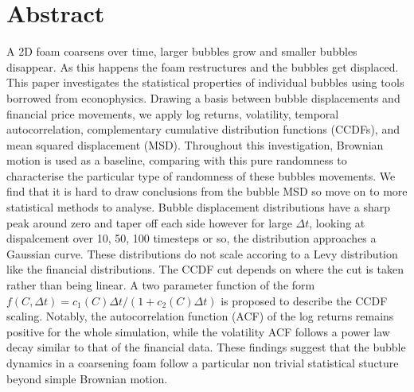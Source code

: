 \section*{Abstract}
A 2D foam coarsens over time, larger bubbles grow and smaller bubbles disappear. As this happens the foam restructures and the bubbles get displaced. This paper investigates the statistical properties of individual bubbles using tools borrowed from econophysics.  Drawing a basis between bubble displacements and financial price movements, we apply log returns, volatility, temporal autocorrelation, complementary cumulative distribution functions (CCDFs), and mean squared displacement (MSD). Throughout this investigation, Brownian motion is used as a baseline, comparing with this pure randomness to characterise the particular type of randomness of these bubbles movements. We find that it is hard to draw conclusions from the bubble MSD so move on to more statistical methods to analyse. Bubble displacement distributions have a sharp peak around zero and taper off each side however for large $\Delta t$, looking at dispalcement over 10, 50, 100 timesteps or so, the distribution approaches a Gaussian curve. These distributions do not scale accoring to a Levy distribution like the financial distributions. The CCDF cut depends on where the cut is taken rather than being linear. A two parameter function of the form $f(C, \Delta t) = c_1(C) \Delta t/ (1 + c_2(C)\Delta t)$ is proposed to describe the CCDF scaling. Notably, the autocorrelation function (ACF) of the log returns remains positive for the whole simulation, while the volatility ACF follows a power law decay similar to that of the financial data. These findings suggest that the bubble dynamics in a coarsening foam follow a particular non trivial statistical stucture beyond simple Brownian motion.